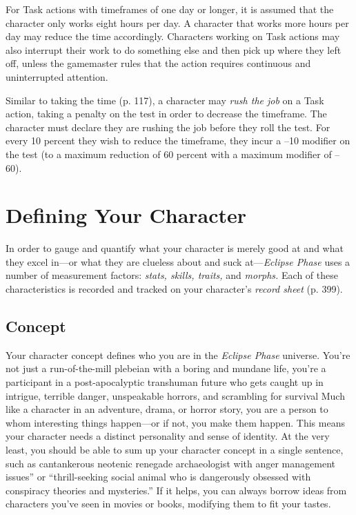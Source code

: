 For Task actions with timeframes of one 
day or longer, it is assumed that the character
only works eight hours per day. A character
that works more hours per day may
reduce the time accordingly. Characters 
working on Task actions may also interrupt
their work to do something else and
then pick up where they left off, unless the 
gamemaster rules that the action requires 
continuous and uninterrupted attention.

Similar to taking the time (p. 117), a 
character may \textit{rush the job} on a Task action, 
taking a penalty on the test in order to decrease
the timeframe. The character must
declare they are rushing the job before they 
roll the test. For every 10 percent they wish 
to reduce the timeframe, they incur a –10 
modifier on the test (to a maximum reduction
of 60 percent with a maximum modifier
of –60).

\section{Defining Your Character}

In order to gauge and quantify what your 
character is merely good at and what they 
excel in—or what they are clueless about 
and suck at—\textit{Eclipse Phase} uses a number 
of measurement factors: \textit{stats, skills, traits,} 
and  \textit{morphs.} Each of these characteristics 
is recorded and tracked on your character's 
\textit{record sheet} (p. 399).

\subsection{Concept}

Your character concept defines who you are 
in the \textit{Eclipse Phase }universe. You're not just 
a run-of-the-mill plebeian with a boring and 
mundane life, you're a participant in a post-apocalyptic
transhuman future who gets
caught up in intrigue, terrible danger, unspeakable
horrors, and scrambling for survival
Much like a character in an adventure,
drama, or horror story, you are a person 
to whom interesting things happen—or if 
not, you make them happen. This means 
your character needs a distinct personality 
and sense of identity. At the very least, you 
should be able to sum up your character 
concept in a single sentence, such as cantankerous
neotenic renegade archaeologist with
anger management issues'' or ``thrill-seeking 
social animal who is dangerously obsessed 
with conspiracy theories and mysteries.'' If 
it helps, you can always borrow ideas from 
characters you've seen in movies or books, 
modifying them to fit your tastes.

